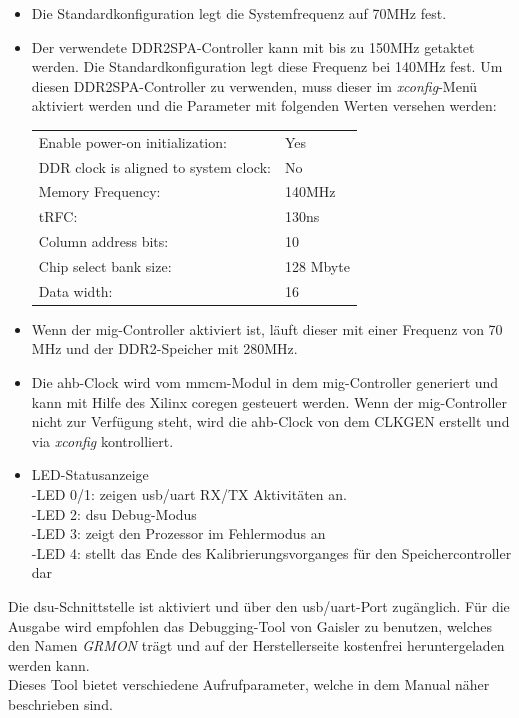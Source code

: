 \begin{itemize}
  \item Die Standardkonfiguration legt die Systemfrequenz auf 70MHz fest.
  \item Der verwendete DDR2SPA-Controller kann mit bis zu 150MHz getaktet werden. Die Standardkonfiguration legt diese Frequenz bei 140MHz fest.
   Um diesen DDR2SPA-Controller zu verwenden, muss dieser im \emph{xconfig}-Menü aktiviert werden und die Parameter mit folgenden Werten versehen werden:\\
  \begin{tabular}[t]{ll}
  Enable power-on initialization: & Yes\\
  DDR clock is aligned to system clock: & No\\
  Memory Frequency: & 140MHz\\
  tRFC: & 130ns\\
  Column address bits:  & 10 \\
  Chip select bank size: & 128 Mbyte\\
  Data width: & 16 \\
  \end{tabular}
  \item Wenn der \ac{mig}-Controller aktiviert ist, läuft dieser mit einer Frequenz von 70 MHz und der DDR2-Speicher mit 280MHz.\\
  \item Die \ac{ahb}-Clock wird vom \ac{mmcm}-Modul in dem \ac{mig}-Controller generiert und kann mit Hilfe des Xilinx \ac{coregen} gesteuert werden.
   Wenn der \ac{mig}-Controller nicht zur Verfügung steht, wird die \ac{ahb}-Clock von dem CLKGEN erstellt und via \emph{xconfig} kontrolliert.\\
  \item LED-Statusanzeige\\
  	-LED 0/1: zeigen \ac{usb}/\ac{uart} RX/TX Aktivitäten an.\\
  	-LED 2: \ac{dsu} Debug-Modus\\
  	-LED 3: zeigt den Prozessor im Fehlermodus an\\
  	-LED 4: stellt das Ende des Kalibrierungsvorganges für den Speichercontroller dar\\
  \end{itemize}
Die \ac{dsu}-Schnittstelle ist aktiviert und über den \ac{usb}/\ac{uart}-Port zugänglich.
  Für die Ausgabe wird empfohlen das Debugging-Tool von Gaisler zu benutzen, welches den Namen \emph{GRMON} trägt und auf der Herstellerseite kostenfrei heruntergeladen werden kann.\\
  Dieses Tool bietet verschiedene Aufrufparameter, welche in dem Manual näher beschrieben sind.\\


